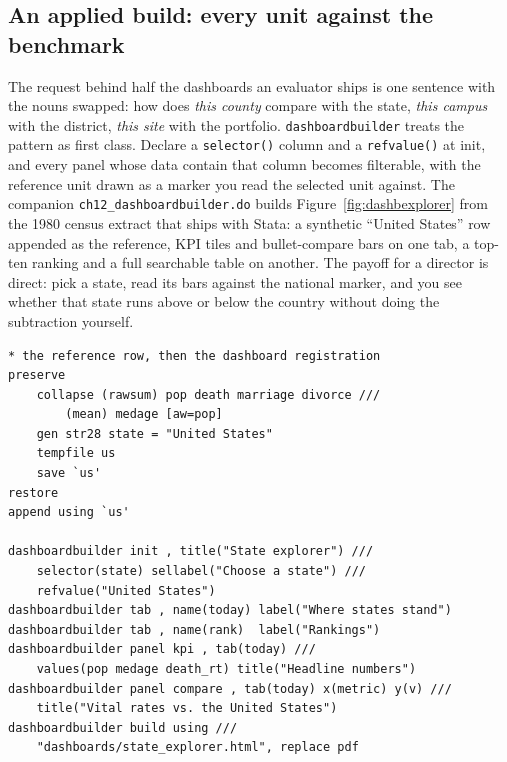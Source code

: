 \subsection{An applied build: every unit against the benchmark}
The request behind half the dashboards an evaluator ships is one sentence with the nouns swapped: how does \emph{this county} compare with the state, \emph{this campus} with the district, \emph{this site} with the portfolio. \texttt{dashboardbuilder} treats the pattern as first class. Declare a \texttt{selector()} column and a \texttt{refvalue()} at init, and every panel whose data contain that column becomes filterable, with the reference unit drawn as a marker you read the selected unit against. The companion \texttt{ch12\_dashboardbuilder.do} builds Figure~\ref{fig:dashbexplorer} from the 1980 census extract that ships with Stata: a synthetic \enquote{United States} row appended as the reference, KPI tiles and bullet-compare bars on one tab, a top-ten ranking and a full searchable table on another. The payoff for a director is direct: pick a state, read its bars against the national marker, and you see whether that state runs above or below the country without doing the subtraction yourself.
\par
{\footnotesize
\begin{verbatim}
* the reference row, then the dashboard registration
preserve
    collapse (rawsum) pop death marriage divorce ///
        (mean) medage [aw=pop]
    gen str28 state = "United States"
    tempfile us
    save `us'
restore
append using `us'

dashboardbuilder init , title("State explorer") ///
    selector(state) sellabel("Choose a state") ///
    refvalue("United States")
dashboardbuilder tab , name(today) label("Where states stand")
dashboardbuilder tab , name(rank)  label("Rankings")
dashboardbuilder panel kpi , tab(today) ///
    values(pop medage death_rt) title("Headline numbers")
dashboardbuilder panel compare , tab(today) x(metric) y(v) ///
    title("Vital rates vs. the United States")
dashboardbuilder build using ///
    "dashboards/state_explorer.html", replace pdf
\end{verbatim}
}

